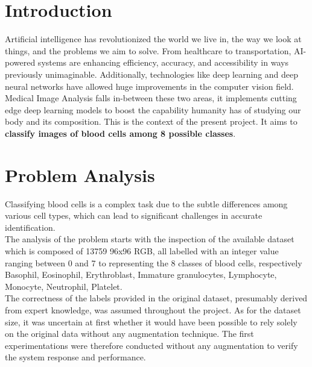 \documentclass[11pt]{article}
\begin{document}
    \begin{multicols}{2}
        
        \section{Introduction}
        Artificial intelligence has revolutionized the world we live in, the way we look at things, and the problems we aim to solve. From healthcare to transportation, AI-powered systems are enhancing efficiency, accuracy, and accessibility in ways previously unimaginable. Additionally, technologies like deep learning and deep neural networks have allowed huge improvements in the computer vision field. 
        \newline
Medical Image Analysis falls in-between these two areas, it implements cutting edge deep learning models to boost the capability humanity has of studying our body and its composition. This is the context of the present project. It aims to \textbf{classify images of blood cells among 8 possible classes}. 
        
        \section{Problem Analysis}

Classifying blood cells is a complex task due to the subtle differences among various cell types, which can lead to significant challenges in accurate identification.\\
	The analysis of the problem starts with the inspection of the available dataset which is composed of 13759 96x96 RGB, all labelled with an integer value ranging between 0 and 7 to representing the 8 classes of blood cells, respectively Basophil, Eosinophil, Erythroblast, Immature granulocytes, Lymphocyte, Monocyte, Neutrophil, Platelet.\\
	The correctness of the labels provided in the original dataset, presumably derived from expert knowledge, was assumed throughout the project.
    As for the dataset size, it was uncertain at first whether it would have been possible to rely solely on the original data without any augmentation technique. The first experimentations were therefore conducted without any augmentation to verify the system response and performance.
	 


\end{multicols}
\end{document}
